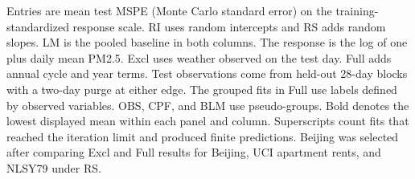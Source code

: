 \begin{table}[!htbp]
\begin{tabular}{@{}lcc@{}}
  \end{tabular}
  \par\smallskip
  \begin{minipage}{\linewidth}
    \footnotesize\raggedright
    Entries are mean test MSPE (Monte Carlo standard error) on the training-standardized response scale. RI uses random intercepts and RS adds random slopes. LM is the pooled baseline in both columns. The response is the log of one plus daily mean PM2.5. Excl uses weather observed on the test day. Full adds annual cycle and year terms. Test observations come from held-out 28-day blocks with a two-day purge at either edge. The grouped fits in Full use labels defined by observed variables. OBS, CPF, and BLM use pseudo-groups. Bold denotes the lowest displayed mean within each panel and column. Superscripts count fits that reached the iteration limit and produced finite predictions. Beijing was selected after comparing Excl and Full results for Beijing, UCI apartment rents, and NLSY79 under RS.
  \end{minipage}
\end{table}

